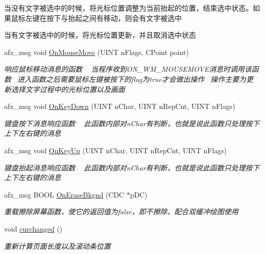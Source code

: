 \begin{DoxyCompactItemize}
\begin{DoxyCompactList}
\begin{DoxyEnumerate}
\item 当没有文字被选中的时候，将光标位置调整为当前抬起的位置，结束选中状态。如果鼠标左键在按下与抬起之间有移动，则会有文字被选中
\item 当有文字被选中的时候，将光标位置更新，并且取消选中状态 
\end{DoxyEnumerate}\end{DoxyCompactList}\item 
afx\+\_\+msg void \hyperlink{class_c_child_view_ad3cb2f8d9fa9a6fb06989513dee5a8bc}{On\+Mouse\+Move} (U\+I\+NT n\+Flags, C\+Point point)
\begin{DoxyCompactList}\small\item\em 响应鼠标移动消息的函数 ~\newline
当程序收到\+O\+N\+\_\+\+W\+M\+\_\+\+M\+O\+U\+S\+E\+M\+O\+V\+E消息时调用该函数~\newline
进入函数之后需要鼠标左键被按下的flag为true才会做出操作~\newline
操作主要为更新选择文字过程中的光标位置以及画面~\newline
\end{DoxyCompactList}\item 
afx\+\_\+msg void \hyperlink{class_c_child_view_a74d87512b76128e2eedea87811363e45}{On\+Key\+Down} (U\+I\+NT n\+Char, U\+I\+NT n\+Rep\+Cnt, U\+I\+NT n\+Flags)
\begin{DoxyCompactList}\small\item\em 键盘按下消息响应函数 ~\newline
此函数内部对n\+Char有判断，也就是说此函数只处理按下上下左右键的消息 \end{DoxyCompactList}\item 
afx\+\_\+msg void \hyperlink{class_c_child_view_afec062448272d8f1e15bcedcb8765abe}{On\+Key\+Up} (U\+I\+NT n\+Char, U\+I\+NT n\+Rep\+Cnt, U\+I\+NT n\+Flags)
\begin{DoxyCompactList}\small\item\em 键盘抬起消息响应函数 ~\newline
此函数内部对n\+Char有判断，也就是说此函数只处理按下上下左右键的消息 \end{DoxyCompactList}\item 
\mbox{\label{class_c_child_view_a6060e6d09d522d345dcee5a01d41c1f0}} 
afx\+\_\+msg B\+O\+OL \hyperlink{class_c_child_view_a6060e6d09d522d345dcee5a01d41c1f0}{On\+Erase\+Bkgnd} (C\+DC $\ast$p\+DC)
\begin{DoxyCompactList}\small\item\em 重载擦除屏幕函数，使它的返回值为false，即不擦除，配合双缓冲绘图使用 \end{DoxyCompactList}\item 
void \hyperlink{class_c_child_view_ab68bf2b03a8e9aab3f2aac2b9ec3177a}{curchanged} ()
\begin{DoxyCompactList}\small\item\em 重新计算页面长度以及滚动条位置 \end{DoxyCompactList}\end{DoxyCompactItemize}
